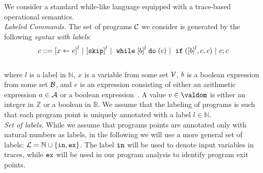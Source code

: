 We consider a standard while-like language equipped with a trace-based operational semantics.\\

\noindent\emph{Labeled Commands.}
The set of programs $\mathcal{C}$ we consider is generated by the following \emph{syntax with labels}: 
\\
\[
{c} ::= 
\clabel{\assign{x}{\expr}}^l 
~|~ \clabel{\eskip}^l
~|~ \ewhile \clabel{\bexpr}^{l} \edo ({c})
~|~ \eif(\clabel{\bexpr}^{l} , {c}, {c}) 
~|~ {c};{c} 
\]
\\
where $l$ is a label in $\mathbb{N}$, $x$ is a variable from
some set $\mathcal{V}$, $b$ is a boolean expression from some set
$\mathcal{B}$, and $e$ is an expression consisting of either an
arithmetic expression $a \in \mathcal{A}$ or a boolean
expression~.
%
A value $v\in\valdom$ is either an integer in $\mathbb{Z}$ or a boolean in $\mathbb{B}$.
We 
assume that the labeling of programs is such that each program
point is uniquely annotated with a label $l\in\mathbb{N}$.
\\

%

\noindent\emph{Set of labels.} While we assume that programs points are annotated only with natural numbers as labels, in the following we will use a more general set of labels: $\mathcal{L} = \mathbb{N}\cup\{\mathtt{in},\mathtt{ex}\}$. The label $\mathtt{in}$ will be used to denote input variables in traces, while $\mathtt{ex}$ will be used in our program analysis to identify program exit points.\\



